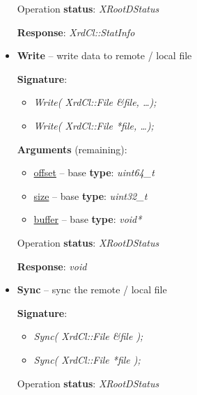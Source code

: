 \documentclass{article}
\begin{document}
\begin{itemize}
\begin{samepage}
                    Operation \textbf{status}: \textit{XRootDStatus}

                    \textbf{Response}: \textit{XrdCl::StatInfo}

                \end{samepage}

                \item \begin{samepage} \textbf{Write} -- write data to remote / local file

                    \textbf{Signature}:
                    \begin{itemize} 
                        \item \textit{Write( XrdCl::File \&file, \ldots);}
                        \item \textit{Write( XrdCl::File *file, \ldots );}
                    \end{itemize}

                    \textbf{Arguments} (remaining):
                    \begin{itemize}
                        \item \underline{offset} -- base \textbf{type}: \textit{uint64_t}
                        \item \underline{size} -- base \textbf{type}: \textit{uint32_t}
                        \item \underline{buffer} -- base \textbf{type}: \textit{void*}
                    \end{itemize}

                    Operation \textbf{status}: \textit{XRootDStatus}

                    \textbf{Response}: \textit{void}

                \end{samepage}

                \item \begin{samepage} \textbf{Sync} -- sync the remote / local file

                    \textbf{Signature}:
                    \begin{itemize} 
                        \item \textit{Sync( XrdCl::File \&file );}
                        \item \textit{Sync( XrdCl::File *file );}
                    \end{itemize}

                    Operation \textbf{status}: \textit{XRootDStatus}


\end{samepage}
\end{itemize}
\end{document}
